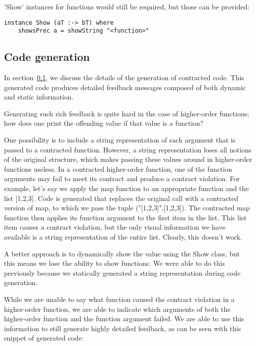 \documentclass[10pt]{report}
\begin{document}
'Show' instances for functions would still be required, but those can be provided:

\begin{lstlisting}
instance Show (aT :-> bT) where
	showsPrec a = showString "<function>"
\end{lstlisting}

\subsection{Code generation}
\label{codegeneration}

In section~\ref{codegeneration}, we discuss the details of the generation of contracted code.
This generated code produces detailed feedback messages composed of both dynamic and static information.

Generating such rich feedback is quite hard in the case of higher-order functions; how does one print the offending value if that value is a function?

One possibility is to include a string representation of each argument that is passed to a contracted function.
However, a string representation loses all notions of the original structure, which makes passing these values around in higher-order functions useless.
In a contracted higher-order function, one of the function arguments may fail to meet its contract and produce a contract violation.
For example, let's say we apply the map function to an appropriate function and the list [1,2,3].
Code is generated that replaces the original call with a contracted version of map, to which we pass the tuple ("[1,2,3]",[1,2,3]).
The contracted map function then applies its function argument to the first item in the list.
This list item causes a contract violation, but the only visual information we have available is a string representation of the entire list.
Clearly, this doesn't work.

A better approach is to dynamically show the value using the Show class, but this means we lose the ability to show functions.
We were able to do this previously because we statically generated a string representation during code generation.

While we are unable to say what function caused the contract violation in a higher-order function, we are able to indicate which arguments of both the higher-order function and the function argument failed.
We are able to use this information to still generate highly detailed feedback, as can be seen with this snippet of generated code:
\end{document}
